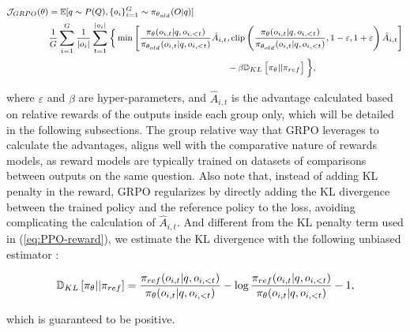 \begin{itemize}[topsep=0pt]
\begin{itemize}[topsep=0pt]
\begin{equation}
\footnotesize
\begin{split}
    \mathcal{J}_{GRPO}(\theta) &= \mathbb{E}{[q \sim P(Q), \{o_i\}_{i=1}^G \sim \pi_{\theta_{old}}(O|q)]}  \\
    & \frac{1}{G}\sum_{i=1}^G\frac{1}{|o_i|} \sum_{t=1}^{|o_i|} \bigg\{ \min \left[ \frac{\pi_\theta(o_{i,t} | q, o_{i,<t})}{\pi_{\theta_{old}}(o_{i,t} | q, o_{i,<t})} \hat{A}_{i,t}, \text{clip} \left( \frac{\pi_\theta(o_{i,t} | q, o_{i,<t})}{\pi_{\theta_{old}}(o_{i,t} | q, o_{i,<t})}, 1 - \varepsilon, 1 + \varepsilon \right)  \hat{A}_{i,t} \right] \\
    & \hspace{6cm} - \beta \mathbb{D}_{KL}\left[\pi_{\theta} || \pi_{ref}\right]\bigg\} ,
\end{split}
\label{eq:GRPO-obj}
\end{equation}

where $\varepsilon$ and $\beta$ are hyper-parameters, and $\hat{A}_{i,t}$  is the advantage calculated based on relative rewards of the outputs inside each group only, which will be detailed in the following subsections. The group relative way that GRPO leverages to calculate the advantages, aligns well with the comparative nature of rewards models,  as reward models are typically trained on datasets of comparisons between outputs on the same question. Also note that, instead of adding KL penalty in the reward, GRPO regularizes by directly adding the KL divergence between the trained policy and the reference policy to the loss, avoiding complicating the calculation of  $\hat{A}_{i,t}$. And different from the KL penalty term used in (\ref{eq:PPO-reward}), we estimate the KL divergence with the following unbiased estimator \citep{kl_approx}:

\begin{equation}
\small
    \mathbb{D}_{KL}\left[\pi_{\theta} || \pi_{ref}\right] = \frac{\pi_{ref}(o_{i,t}|q,o_{i,<t})}{\pi_{\theta}(o_{i,t}|q,o_{i,<t})}- \log\frac{\pi_{ref}(o_{i,t}|q,o_{i,<t})}{\pi_{\theta}(o_{i,t}|q,o_{i,<t})} - 1,
\end{equation}

which is guaranteed to be positive.


\end{itemize}
\end{itemize}
